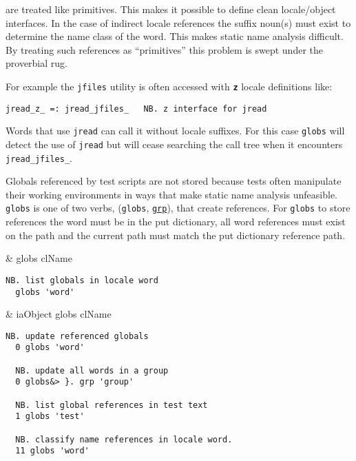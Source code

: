 \noindent are treated like primitives. This makes it possible to define clean locale/object 
interfaces. In the case of indirect locale references the suffix noun(s) must exist 
to determine the name class of the word. This makes static name analysis difficult. 
By treating such references as ``primitives'' this problem is swept 
under the proverbial rug. 

For example the \texttt{jfiles} utility is often 
accessed with \textbf{\texttt{z}} locale definitions like: 

\begin{lstlisting}[frame=single,framerule=0pt] 
   jread_z_ =: jread_jfiles_   NB. z interface for jread
\end{lstlisting}

Words that use \texttt{jread} can call it without locale suffixes. 
For this case \texttt{globs} will detect the use of \texttt{jread} but will 
cease searching the call tree when it encounters \verb|jread_jfiles_|.

Globals referenced by test scripts are not stored because tests 
often manipulate their working environments in ways that make 
static name analysis unfeasible. \texttt{globs} is one of two verbs, 
(\texttt{globs}, \hyperlink{il:grp}{\texttt{grp}}), that create references. 
For \texttt{globs} to store 
references the word must be in the put dictionary, all 
word references must exist on the path and the current 
path must match the put dictionary reference path. 

\begin{wordhead}
\monad & globs clName \\
\end{wordhead}
\begin{lstlisting}[frame=single,framerule=0pt] 
  NB. list globals in locale word 
  globs 'word' 
\end{lstlisting}

\begin{wordhead}
\dyad & iaObject globs clName \\
\end{wordhead}
\begin{lstlisting}[frame=single,framerule=0pt] 
  NB. update referenced globals
  0 globs 'word' 

  NB. update all words in a group
  0 globs&> }. grp 'group' 

  NB. list global references in test text
  1 globs 'test'           

  NB. classify name references in locale word. 
  11 globs 'word'  
\end{lstlisting}


